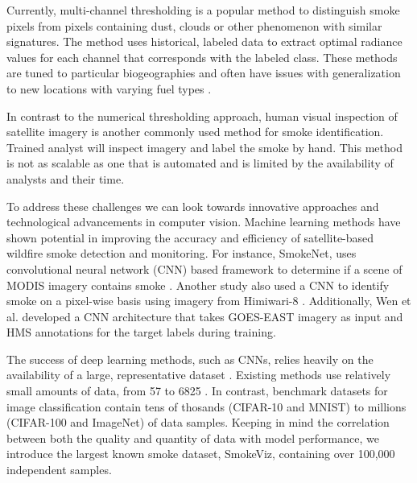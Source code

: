 \documentclass{ametsocV6.1}
\begin{document}
Currently, multi-channel thresholding is a popular method to distinguish smoke pixels from pixels containing dust, clouds or other phenomenon with similar signatures. The method uses historical, labeled data to extract optimal radiance values for each channel that corresponds with the labeled class. These methods are tuned to particular biogeographies and often have issues with generalization to new locations with varying fuel types \citep{thresh_geog}.

In contrast to the numerical thresholding approach, human visual inspection of satellite imagery is another commonly used method for smoke identification. Trained analyst will inspect imagery and label the smoke by hand. This method is not as scalable as one that is automated and is limited by the availability of analysts and their time.


To address these challenges we can look towards innovative approaches and technological advancements in computer vision. Machine learning methods have shown potential in improving the accuracy and efficiency of satellite-based wildfire smoke detection and monitoring. For instance, SmokeNet, uses convolutional neural network (CNN) based framework to determine if a scene of MODIS imagery contains smoke \citep{smokenet}. Another study also used a CNN to identify smoke on a pixel-wise basis
using imagery from Himiwari-8 \citep{larsen}. Additionally, Wen et al. developed a CNN architecture that takes GOES-EAST imagery as input and HMS annotations for the target labels during training\citep{smoke_goes}. 

The success of deep learning methods, such as CNNs, relies heavily on the availability of a large, representative dataset \citep{data_size}. Existing methods use relatively small amounts of data, from 57 \citep{wang} to 6825 \citep{smoke_goes}. In contrast, benchmark datasets for image classification contain tens of thosands (CIFAR-10 and MNIST) to millions (CIFAR-100 and ImageNet) of data samples. Keeping in mind the correlation between both the quality and quantity of data with model performance, we introduce the largest known smoke dataset, SmokeViz, containing over 100,000 independent samples.
\end{document}
